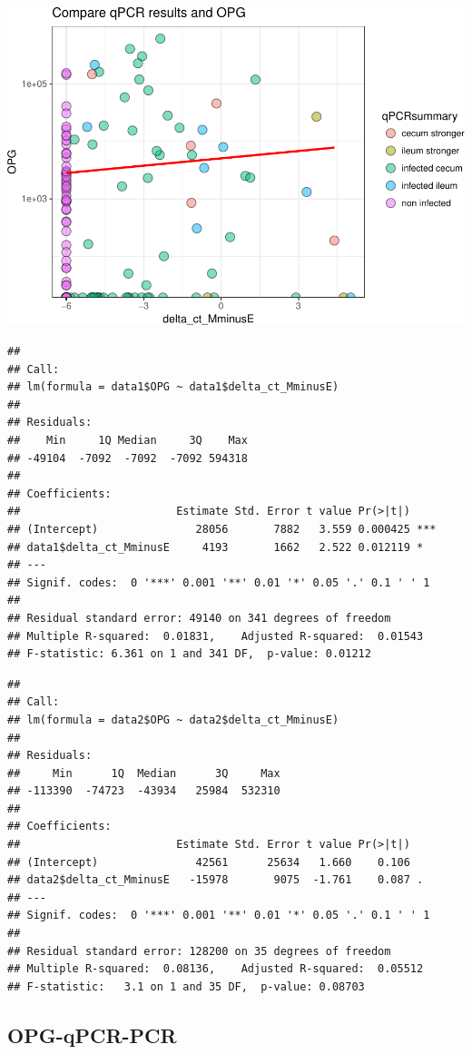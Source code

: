 \documentclass[]{article}
\begin{document}
\includegraphics{Data_Analysis_Alice_files/figure-latex/opgqpcr-1.pdf}

\begin{verbatim}
## 
## Call:
## lm(formula = data1$OPG ~ data1$delta_ct_MminusE)
## 
## Residuals:
##    Min     1Q Median     3Q    Max 
## -49104  -7092  -7092  -7092 594318 
## 
## Coefficients:
##                        Estimate Std. Error t value Pr(>|t|)    
## (Intercept)               28056       7882   3.559 0.000425 ***
## data1$delta_ct_MminusE     4193       1662   2.522 0.012119 *  
## ---
## Signif. codes:  0 '***' 0.001 '**' 0.01 '*' 0.05 '.' 0.1 ' ' 1
## 
## Residual standard error: 49140 on 341 degrees of freedom
## Multiple R-squared:  0.01831,    Adjusted R-squared:  0.01543 
## F-statistic: 6.361 on 1 and 341 DF,  p-value: 0.01212
\end{verbatim}

\begin{verbatim}
## 
## Call:
## lm(formula = data2$OPG ~ data2$delta_ct_MminusE)
## 
## Residuals:
##     Min      1Q  Median      3Q     Max 
## -113390  -74723  -43934   25984  532310 
## 
## Coefficients:
##                        Estimate Std. Error t value Pr(>|t|)  
## (Intercept)               42561      25634   1.660    0.106  
## data2$delta_ct_MminusE   -15978       9075  -1.761    0.087 .
## ---
## Signif. codes:  0 '***' 0.001 '**' 0.01 '*' 0.05 '.' 0.1 ' ' 1
## 
## Residual standard error: 128200 on 35 degrees of freedom
## Multiple R-squared:  0.08136,    Adjusted R-squared:  0.05512 
## F-statistic:   3.1 on 1 and 35 DF,  p-value: 0.08703
\end{verbatim}

\subsection{OPG-qPCR-PCR}\label{opg-qpcr-pcr}
\end{document}
